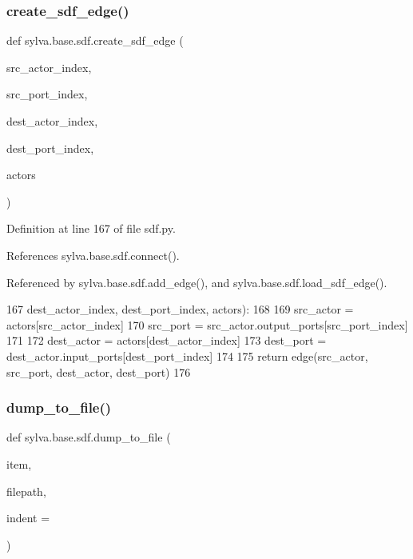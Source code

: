 \subsubsection{\texorpdfstring{create\+\_\+sdf\+\_\+edge()}{create\_sdf\_edge()}}
{\footnotesize\ttfamily def sylva.\+base.\+sdf.\+create\+\_\+sdf\+\_\+edge (\begin{DoxyParamCaption}\item[{}]{src\+\_\+actor\+\_\+index,  }\item[{}]{src\+\_\+port\+\_\+index,  }\item[{}]{dest\+\_\+actor\+\_\+index,  }\item[{}]{dest\+\_\+port\+\_\+index,  }\item[{}]{actors }\end{DoxyParamCaption})}



Definition at line 167 of file sdf.\+py.



References sylva.\+base.\+sdf.\+connect().



Referenced by sylva.\+base.\+sdf.\+add\+\_\+edge(), and sylva.\+base.\+sdf.\+load\+\_\+sdf\+\_\+edge().


\begin{DoxyCode}
167                         dest\_actor\_index, dest\_port\_index, actors):
168 
169         src\_actor = actors[src\_actor\_index]
170         src\_port = src\_actor.output\_ports[src\_port\_index]
171 
172         dest\_actor = actors[dest\_actor\_index]
173         dest\_port = dest\_actor.input\_ports[dest\_port\_index]
174 
175         \textcolor{keywordflow}{return} edge(src\_actor, src\_port, dest\_actor, dest\_port)
176 
\end{DoxyCode}
\mbox{\label{namespacesylva_1_1base_1_1sdf_a55c1c6ea91b0ed9948ce670cd269b88b}} 
\subsubsection{\texorpdfstring{dump\+\_\+to\+\_\+file()}{dump\_to\_file()}}
{\footnotesize\ttfamily def sylva.\+base.\+sdf.\+dump\+\_\+to\+\_\+file (\begin{DoxyParamCaption}\item[{}]{item,  }\item[{}]{filepath,  }\item[{}]{indent = {} }\end{DoxyParamCaption})}



